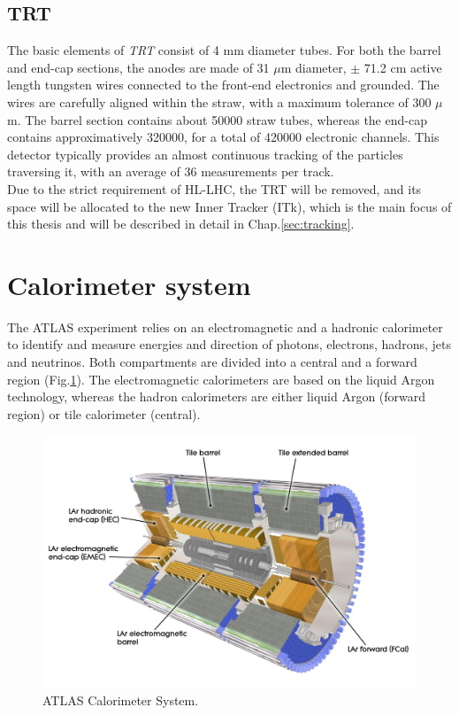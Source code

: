 \documentclass[a4paper,twoside,12pt]{book}
\begin{document}
\subsection*{TRT}
The basic elements of \textit{TRT} consist of 4 mm diameter tubes\cite{Aad:2008zzm}. For both the barrel
and end-cap sections, the anodes are made of 31 $\mu$m diameter, $\pm$ 71.2 cm 
active length tungsten wires 
connected to the front-end electronics and grounded. The wires are carefully aligned within
the straw, with a maximum tolerance of 300 $\mu$m. The barrel section contains about 
50000 straw tubes, whereas the end-cap contains approximatively 320000,
for a total of 420000 electronic channels\cite{ATLAS:1997ag}. This detector typically provides
an almost continuous tracking of the particles traversing it, with an average of 36 measurements per track.\\

Due to the strict requirement of HL-LHC, the TRT will be removed, and its space will be allocated to the new
Inner Tracker (ITk), which is the main focus of this thesis and will be described in detail in Chap.\ref{sec:tracking}.

\section{Calorimeter system}

The ATLAS experiment  relies on an electromagnetic and a hadronic calorimeter to identify and measure energies and direction of photons, electrons, hadrons, jets and neutrinos. 
Both compartments are divided into a central and a forward region (Fig.\ref{fig:current_Cals}). The electromagnetic calorimeters are based on the liquid Argon technology,
whereas the hadron calorimeters are either liquid Argon (forward region) or tile calorimeter (central).\\

\begin{figure} [h]
	\includegraphics[width=\textwidth]{current_Cals}
	\caption{ATLAS Calorimeter System.}
	\label{fig:current_Cals}
\end{figure}
\end{document}
